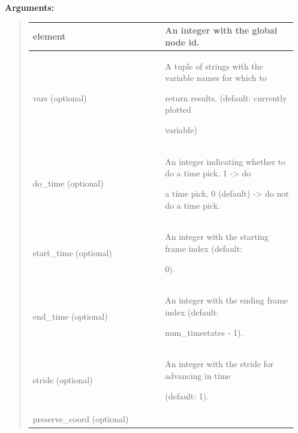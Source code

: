 \documentclass[letterpaper,10pt,english]{sphinxmanual}
\begin{document}
\begin{DUlineblock}{0em}
\item[] 
\item[] \textbf{Arguments:}
\end{DUlineblock}
\begin{quote}

\begin{tabular}{|p{0.475\linewidth}|p{0.475\linewidth}|}
\hline

element
 & 
An integer with the global node id.
\\
\hline
vars (optional)
 & 
\begin{DUlineblock}{0em}
\item[] A tuple of strings with the variable names for which to
\item[] return results. (default: currently plotted
\item[] variable)
\end{DUlineblock}
\\
\hline
do\_time (optional)
 & 
\begin{DUlineblock}{0em}
\item[] An integer indicating whether to do a time pick. 1 -\textgreater{} do
\item[] a time pick, 0 (default) -\textgreater{} do not do a time pick.
\end{DUlineblock}
\\
\hline
start\_time (optional)
 & 
\begin{DUlineblock}{0em}
\item[] An integer with the starting frame index (default:
\item[] 0).
\end{DUlineblock}
\\
\hline
end\_time (optional)
 & 
\begin{DUlineblock}{0em}
\item[] An integer with the ending frame index (default:
\item[] num\_timestates - 1).
\end{DUlineblock}
\\
\hline
stride (optional)
 & 
\begin{DUlineblock}{0em}
\item[] An integer with the stride for advancing in time
\item[] (default: 1).
\end{DUlineblock}
\\
\hline
preserve\_coord (optional)
 & 
\begin{DUlineblock}{0em}

\end{DUlineblock}
\end{tabular}
\end{quote}
\end{document}
